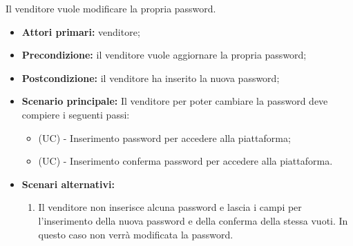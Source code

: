 Il venditore vuole modificare la propria password.
\begin{itemize}
    \item \textbf{Attori primari:} venditore;
    \item \textbf{Precondizione:} il venditore vuole aggiornare la propria password;
    \item \textbf{Postcondizione:} il venditore ha inserito la nuova password;
    \item \textbf{Scenario principale:} Il venditore per poter cambiare la password deve compiere i seguenti passi:
        \begin{itemize}
            \item (UC) - Inserimento password per accedere alla piattaforma; %
            \item (UC) - Inserimento conferma password per accedere alla piattaforma. %
        \end{itemize}
    \item \textbf{Scenari alternativi:}
    \begin{enumerate}[label=\lett]
    	\item Il venditore non inserisce alcuna password e lascia i campi per l'inserimento della nuova password e della conferma della stessa vuoti. In questo caso non verrà modificata la password.
    \end{enumerate}
\end{itemize}


